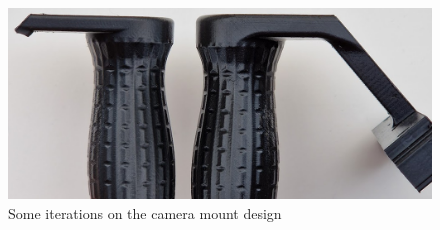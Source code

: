 \begin{figure}[H]
    \centering
    \includegraphics[width=\textwidth]{figures/3d_print/thickness.png}
    \caption{Some iterations on the camera mount design}
    \label{fig:handle_thickness}
\end{figure}

